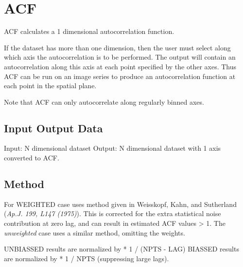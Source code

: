 \documentclass{book}
\renewcommand{\_}{{\tt\char'137}}     %
\begin{document}
\section{ACF}
ACF calculates a 1 dimensional autocorrelation function.

If the dataset has more than one dimension, then the user must
select along which axis the autocorrelation is to be performed.
The output will contain an autocorrelation along this axis at
each point specified by the other axes. Thus ACF can be run on an
image series to produce an autocorrelation function at each point
in the spatial plane.

Note that ACF can only autocorrelate along regularly binned axes.

\subsection{Input Output Data}
Input: N dimensional dataset
Output: N dimensional dataset with 1 axis converted to ACF.
\subsection{Method}
For WEIGHTED case uses method given in Weisskopf, Kahn, and
Sutherland ({\em Ap.J. 199, L147 (1975)}). This is corrected for
the extra statistical noise contribution at zero lag, and
can result in estimated ACF values > 1. The {\em unweighted} case
uses a similar method, omitting the weights.

UNBIASSED results are normalized by * 1 / (NPTS - LAG)
BIASSED results are normalized by * 1 / NPTS (suppressing large
lags).
\end{document}
